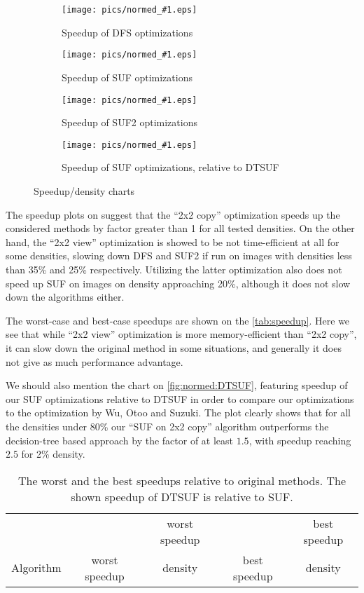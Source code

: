 \documentclass[hidelinks]{llncs}
\begin{document}
\newcommand{\inputnorm}[2]{
  \begin{subfigure}[t]{0.45\linewidth}
    \centering
    \texttt{[image: pics/normed\_\#1.eps]}
    \caption{Speedup of #2}
    \label{fig:normed:#1}
  \end{subfigure}
}

\begin{figure}
  \centering
  \inputnorm{DFS}{DFS optimizations}
  \inputnorm{SUF}{SUF optimizations}
  \inputnorm{SUF2}{SUF2 optimizations}
  \inputnorm{DTSUF}{SUF optimizations, relative to DTSUF}
  \caption{Speedup/density charts}
  \label{fig:normed}
\end{figure}

The speedup plots on 
suggest that the ``2x2 copy'' optimization speeds up the considered methods by
factor greater than 1 for all tested densities. On the other hand, the
``2x2 view'' optimization is showed to be not time-efficient at all for some
densities, slowing down DFS and SUF2 if run on images with densities less than
35\% and 25\% respectively. Utilizing the latter optimization also does not
speed up SUF on images on density approaching 20\%, although it does not slow
down the algorithms either.

The worst-case and best-case speedups are shown on the \autoref{tab:speedup}.
Here we see that while ``2x2 view'' optimization is more memory-efficient than
``2x2 copy'', it can slow down the original method in some situations, and
generally it does not give as much performance advantage.

We should also mention the chart on \autoref{fig:normed:DTSUF}, featuring
speedup of our SUF optimizations relative to DTSUF in order to compare our
optimizations to the optimization by Wu, Otoo and Suzuki. The plot clearly shows
that for all the densities under 80\% our ``SUF on 2x2 copy'' algorithm
outperforms the decision-tree based approach by the factor of at least $1.5$,
with speedup reaching $2.5$ for 2\% density.

\begin{table}
  \centering
  \begin{tabular}{l|c|c|c|c}
              &               & worst speedup &              & best speedup \\
    Algorithm & worst speedup & density       & best speedup & density \\
    \hline
    
  \end{tabular}
  \caption{The worst and the best speedups relative to original methods. The
    shown speedup of DTSUF is relative to SUF.}
  \label{tab:speedup}
\end{table}
\end{document}
